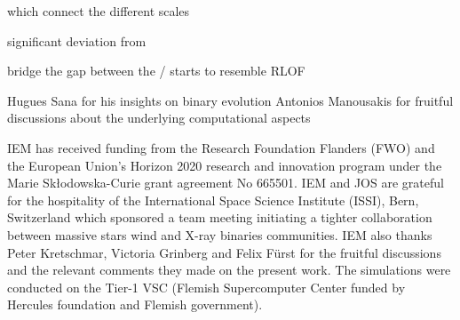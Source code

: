 \documentclass{aa}
\begin{document}
which connect the different scales 

significant deviation from 

bridge the gap between the  / starts to resemble RLOF


\begin{acknowledgements}
Hugues Sana for his insights on binary evolution
Antonios Manousakis for fruitful discussions about the underlying computational aspects

IEM has received funding from the Research Foundation Flanders (FWO) and the European Union's Horizon 2020 research and innovation program under the Marie Sk\l odowska-Curie grant agreement No 665501. IEM and JOS are grateful for the hospitality of the International Space Science Institute (ISSI), Bern, Switzerland which sponsored a team meeting initiating a tighter collaboration between massive stars wind and X-ray binaries communities. IEM also thanks Peter Kretschmar, Victoria Grinberg and Felix F\"urst for the fruitful discussions and the relevant comments they made on the present work. The simulations were conducted on the Tier-1 VSC (Flemish Supercomputer Center funded by Hercules foundation and Flemish government).


\end{acknowledgements}




\begin{tiny}

\end{tiny}

%
%
%
%
%
%
%   
%  
%
%
\end{document}
